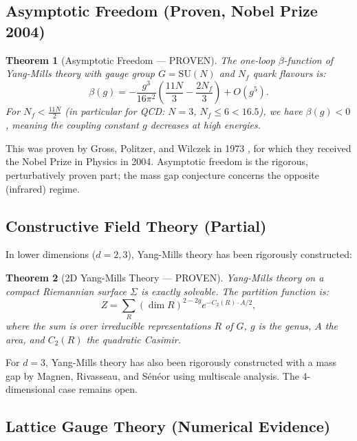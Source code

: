 \documentclass[12pt,a4paper]{amsart}
\newtheorem{theorem}{Theorem}[section]
\theoremstyle{definition}
\theoremstyle{remark}
\begin{document}
\subsection{Asymptotic Freedom (Proven, Nobel Prize 2004)}

\begin{theorem}[Asymptotic Freedom — PROVEN]
\label{thm:asymptotic-freedom}
The one-loop $\beta$-function of Yang-Mills theory with gauge group $G = \mathrm{SU}(N)$
and $N_f$ quark flavours is:
\[
  \beta(g) = -\frac{g^3}{16\pi^2} \left( \frac{11N}{3} - \frac{2N_f}{3} \right) + O(g^5).
\]
For $N_f < \frac{11N}{2}$ (in particular for QCD: $N=3$, $N_f \leq 6 < 16.5$), we have
$\beta(g) < 0$, meaning the coupling constant $g$ decreases at high energies.
\end{theorem}

This was proven by Gross, Politzer, and Wilczek in 1973 \cite{GrossWilczek1973,Politzer1973},
for which they received the Nobel Prize in Physics in 2004. Asymptotic freedom is the
rigorous, perturbatively proven part; the mass gap conjecture concerns the opposite
(infrared) regime.

\subsection{Constructive Field Theory (Partial)}

In lower dimensions ($d = 2, 3$), Yang-Mills theory has been rigorously constructed:

\begin{theorem}[2D Yang-Mills Theory — PROVEN]
Yang-Mills theory on a compact Riemannian surface $\Sigma$ is exactly solvable.
The partition function is:
\[
  Z = \sum_R (\dim R)^{2-2g} e^{-C_2(R) \cdot A / 2},
\]
where the sum is over irreducible representations $R$ of $G$, $g$ is the genus, $A$
the area, and $C_2(R)$ the quadratic Casimir.
\end{theorem}

For $d = 3$, Yang-Mills theory has also been rigorously constructed with a mass gap
by Magnen, Rivasseau, and S\'en\'eor \cite{MagnenRivasseau1993} using multiscale
analysis. The 4-dimensional case remains open.

\subsection{Lattice Gauge Theory (Numerical Evidence)}
\end{document}
